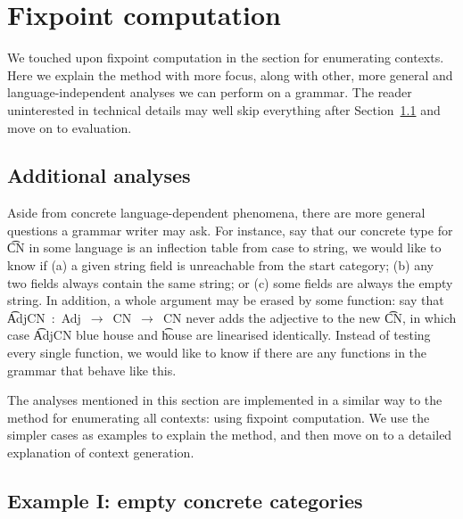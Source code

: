 \section{Fixpoint computation}
\label{sec:moreFP}

We touched upon fixpoint computation in the section for enumerating
contexts. Here we explain the method with more focus, along with
other, more general and language-independent analyses we can perform
on a grammar. The reader uninterested in technical details may well
skip everything after Section~\ref{additional-analyses} and move on to
evaluation.

\subsection{Additional analyses}
\label{additional-analyses}

Aside from concrete language-dependent phenomena, there are more
general questions a grammar writer may ask. For instance, say that our
concrete type for \t{CN} in some language is an inflection table
from case to string, we would like to know if (a) a given string field
is unreachable from the start category; (b) any two fields always
contain the same string; or (c) some fields are always the empty
string.  In addition, a whole argument may be erased by some function:
say that \t{AdjCN~:~Adj~$\rightarrow$~CN~$\rightarrow$~CN} never adds
the adjective to the new \t{CN}, in which case \t{AdjCN blue house}
and \t{house} are linearised identically. Instead of testing every
single function, we would like to know if there are any functions in
the grammar that behave like this.


The analyses mentioned in this section are implemented in a similar
way to the method for enumerating all contexts: using fixpoint
computation. We use the simpler cases as examples to explain the
method, and then move on to a detailed explanation of context
generation.

\subsection{Example I: empty concrete categories}

